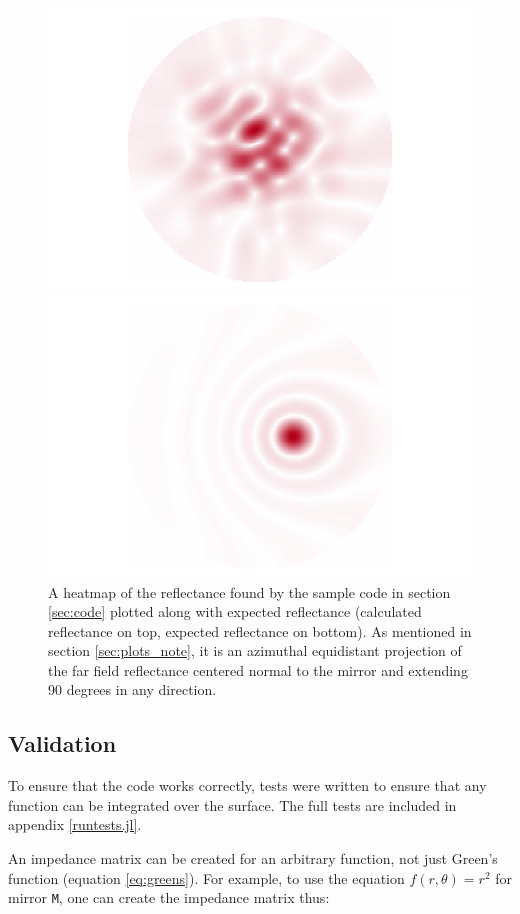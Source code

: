 \documentclass[etd,senior,noacknowledgments]{BYUPhys}
\begin{document}
\begin{figure}
  \centerline{\includegraphics[width=.7\textwidth]{sample-reflectance}}
  \centerline{\includegraphics[width=.7\textwidth]{sample-reflectance-expected}}
  \caption[heatmap from the above sample code]{\label{fig:sample_heatmap}
    A heatmap of the reflectance found by the sample code in section \ref{sec:code} plotted along with expected reflectance (calculated reflectance on top, expected reflectance on bottom). As mentioned in section \ref{sec:plots_note}, it is an azimuthal equidistant projection of the far field reflectance centered normal to the mirror and extending 90 degrees in any direction.}
\end{figure}



\subsection{Validation} \label{sec:validation}

To ensure that the code works correctly, tests were written to ensure that any function can be integrated over the surface. The full tests are included in appendix \ref{runtests.jl}.

An impedance matrix can be created for an arbitrary function, not just Green's function (equation \ref{eq:greens}). For example, to use the equation $f\left(r, \theta\right) = r^2$ for mirror \texttt{M}, one can create the impedance matrix thus:
\end{document}
